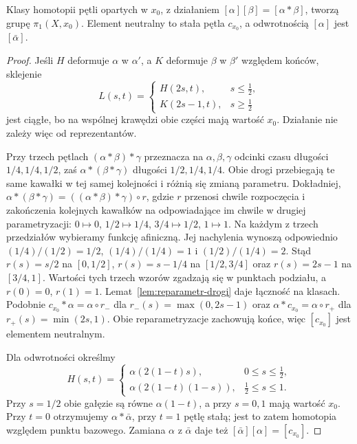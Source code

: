 \begin{twierdzenie}
\label{thm:grupa-podstawowa}
Klasy homotopii pętli opartych w $x_0$,
z działaniem $[\alpha][\beta]=[\alpha*\beta]$,
tworzą grupę $\pi_1(X,x_0)$.
Element neutralny to stała pętla $c_{x_0}$,
a odwrotnością $[\alpha]$ jest $[\bar\alpha]$.
\end{twierdzenie}
\begin{proof}
Jeśli $H$ deformuje $\alpha$ w $\alpha'$,
a $K$ deformuje $\beta$ w $\beta'$
względem końców, sklejenie
\[
 L(s,t)=
 \begin{cases}
   H(2s,t),&s\leq\tfrac12,\\
   K(2s-1,t),&s\geq\tfrac12
 \end{cases}
\]
jest ciągłe, bo na wspólnej krawędzi
obie części mają wartość $x_0$.
Działanie nie zależy więc od reprezentantów.

Przy trzech pętlach $(\alpha*\beta)*\gamma$
przeznacza na $\alpha,\beta,\gamma$
odcinki czasu długości $1/4,1/4,1/2$,
zaś $\alpha*(\beta*\gamma)$ długości
$1/2,1/4,1/4$. Obie drogi przebiegają
te same kawałki w tej samej kolejności
i różnią się zmianą parametru. Dokładniej,
$\alpha*(\beta*\gamma)=((\alpha*\beta)*\gamma)\circ r$,
gdzie $r$ przenosi chwile rozpoczęcia i zakończenia kolejnych
kawałków na odpowiadające im chwile w drugiej parametryzacji:
$0\mapsto0$, $1/2\mapsto1/4$, $3/4\mapsto1/2$, $1\mapsto1$.
Na każdym z trzech przedziałów wybieramy funkcję afiniczną.
Jej nachylenia wynoszą odpowiednio
$(1/4)/(1/2)=1/2$, $(1/4)/(1/4)=1$ i $(1/2)/(1/4)=2$.
Stąd $r(s)=s/2$ na $[0,1/2]$,
$r(s)=s-1/4$ na $[1/2,3/4]$ oraz
$r(s)=2s-1$ na $[3/4,1]$.
Wartości tych trzech wzorów zgadzają się
w punktach podziału, a $r(0)=0$, $r(1)=1$.
Lemat~\ref{lem:reparametr-drogi} daje łączność
na klasach. Podobnie $c_{x_0}*\alpha=\alpha\circ r_-$
dla $r_-(s)=\max(0,2s-1)$ oraz
$\alpha*c_{x_0}=\alpha\circ r_+$
dla $r_+(s)=\min(2s,1)$.
Obie reparametryzacje zachowują końce,
więc $[c_{x_0}]$ jest elementem neutralnym.

Dla odwrotności określmy
\[
 H(s,t)=
 \begin{cases}
  \alpha(2(1-t)s),&0\leq s\leq\tfrac12,\\
  \alpha(2(1-t)(1-s)),&\tfrac12\leq s\leq1.
 \end{cases}
\]
Przy $s=1/2$ obie gałęzie są równe
$\alpha(1-t)$, a przy $s=0,1$ mają
wartość $x_0$. Przy $t=0$ otrzymujemy
$\alpha*\bar\alpha$, przy $t=1$ pętlę stałą;
jest to zatem homotopia względem punktu bazowego.
Zamiana $\alpha$ z $\bar\alpha$ daje też
$[\bar\alpha][\alpha]=[c_{x_0}]$.
\end{proof}

